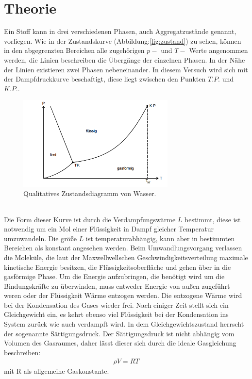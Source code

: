 \section{Theorie}
\label{sec:Theorie}

\cite{sample}
Ein Stoff kann in drei verschiedenen Phasen, auch Aggregatzustände genannt, vorliegen.
Wie in der Zustandskurve (Abbildung:\ref{fig:zustand}) zu sehen, können in den abgegrenzten
Bereichen alle zugehörigen $p-$ und $T-$ Werte angenommen werden, die Linien
beschreiben die Übergänge der einzelnen Phasen. In der Nähe der Linien existieren zwei
Phasen nebeneinander. In diesem Versuch wird sich mit der Dampfdruckkurve beschaftigt, diese
liegt zwischen den Punkten $T.P.$ und $K.P.$.
\begin{figure}
 \centering
 \includegraphics[width=0.7\textwidth]{zustand.png}
 \caption{Qualitatives Zustandsdiagramm von Wasser.}
 \label{fig:zusatnd}
 \end{figure}\\
 Die Form dieser Kurve ist durch die Verdampfungswärme $L$ bestimmt, diese ist notwendig um
 ein Mol einer Flüssigkeit in Dampf gleicher Temperatur umzuwandeln. Die größe $L$ ist
 temperaturabhängig, kann aber in bestimmten Bereichen als konstant angesehen werden.
 Beim Umwandlungsvorgang verlassen die Moleküle, die laut der Maxwellwellschen
 Geschwindigkeitsverteilung maximale kinetische Energie besitzen, die Flüssigkeitsoberfläche
 und gehen über in die gasförmige Phase. Um die Energie aufzubringen, die benötigt wird um
 die Bindungskräfte zu überwinden, muss entweder Energie von außen zugeführt weren oder
 der Flüssigkeit Wärme entzogen werden. Die entzogene Wärme wird bei der Kondensation des
 Gases wieder frei. Nach einiger Zeit stellt sich ein Gleichgewicht ein, es kehrt ebenso
 viel Flüssigkeit bei der Kondensation ins System zurück wie auch verdampft wird.
 In dem Gleichgewichtszustand herrscht der sogenannte Sättigungsdruck.
 Der Sättigungsdruck ist nicht abhängig vom Volumen des Gasraumes, daher lässt dieser sich durch
 die ideale Gasgleichung beschreiben:
 \begin{align}
 \rho V =RT
 \end{align}
 mit R als allgemeine Gaskonstante.
